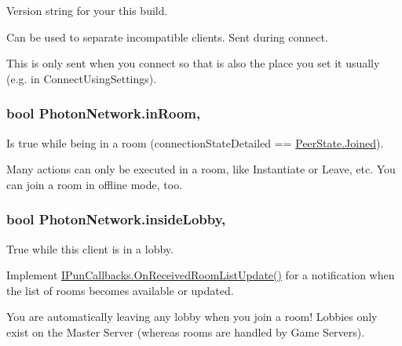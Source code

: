 Version string for your this build. 

Can be used to separate incompatible clients. Sent during connect.

This is only sent when you connect so that is also the place you set it usually (e.\+g. in Connect\+Using\+Settings).
\subsubsection[{\texorpdfstring{in\+Room}{inRoom}}]{\setlength{\rightskip}{0pt plus 5cm}bool Photon\+Network.\+in\+Room\hspace{0.3cm}{\ttfamily [static]}, {\ttfamily [get]}}\hypertarget{class_photon_network_a4f968278990dea7202b04eed1f833b6c}{}\label{class_photon_network_a4f968278990dea7202b04eed1f833b6c}


Is true while being in a room (connection\+State\+Detailed == \hyperlink{group__public_api_gga91cc003c03acb26c6f1530440ebdbc88a7d50c09f1ad7d098e0a847bcdcab7efb}{Peer\+State.\+Joined}). 

Many actions can only be executed in a room, like Instantiate or Leave, etc. You can join a room in offline mode, too. 
\subsubsection[{\texorpdfstring{inside\+Lobby}{insideLobby}}]{\setlength{\rightskip}{0pt plus 5cm}bool Photon\+Network.\+inside\+Lobby\hspace{0.3cm}{\ttfamily [static]}, {\ttfamily [get]}}\hypertarget{class_photon_network_a8ad64b1a76c7918bbe5642639afff458}{}\label{class_photon_network_a8ad64b1a76c7918bbe5642639afff458}


True while this client is in a lobby. 

Implement \hyperlink{interface_i_pun_callbacks_ad3e808558f778aec6b12e950d9632506}{I\+Pun\+Callbacks.\+On\+Received\+Room\+List\+Update()} for a notification when the list of rooms becomes available or updated.

You are automatically leaving any lobby when you join a room! Lobbies only exist on the Master Server (whereas rooms are handled by Game Servers). 
